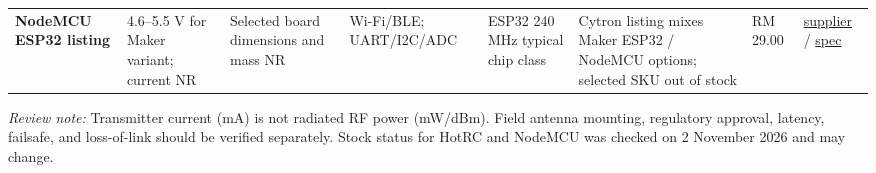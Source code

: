 \documentclass[10pt,a4paper]{article}
\begin{document}
\begin{landscape}
\begin{longtable}{@{}L{34.5mm}L{26.3mm}L{32.0mm}L{28.7mm}L{36.1mm}L{37.8mm}L{14.8mm}L{27.9mm}@{}}
\textbf{NodeMCU ESP32 listing} & 4.6--5.5 V for Maker variant; current NR & Selected board dimensions and mass NR & Wi-Fi/BLE; UART/I2C/ADC & ESP32 240 MHz typical chip class & Cytron listing mixes Maker ESP32 / NodeMCU options; selected SKU out of stock & RM 29.00 & \href{https://my.cytron.io/c-wireless-devices/c-wifi/p-nodemcu-esp32-with-expansion-board}{supplier} / \href{https://my.cytron.io/c-wireless-devices/c-wifi/p-nodemcu-esp32-with-expansion-board}{spec} \\
\end{longtable}
\textit{Review note:} Transmitter current (mA) is not radiated RF power (mW/dBm). Field antenna mounting, regulatory approval, latency, failsafe, and loss-of-link should be verified separately. Stock status for HotRC and NodeMCU was checked on 2 November 2026 and may change.
\end{landscape}
\end{document}
